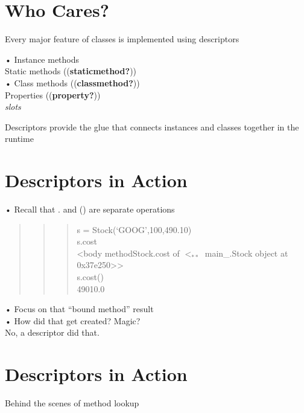 \documentclass[
  letterpaper,
  DIV=11,
  numbers=noendperiod]{scrreprt}
\begin{document}

\chapter{Who Cares?}\label{who-cares}

Every major feature of classes is implemented using descriptors

• Instance methods\\
Static methods ((\textbf{staticmethod?}))\\
• Class methods ((\textbf{classmethod?}))\\
Properties ((\textbf{property?}))\\
\emph{slots}

Descriptors provide the glue that connects instances and classes
together in the runtime


\chapter{Descriptors in Action}\label{descriptors-in-action}

• Recall that . and () are separate operations

\begin{quote}
\begin{quote}
\begin{quote}
s = Stock(`GOOG',100,490.10)\\
s.cost\\
\textless body methodStock.cost of \(<  _{**}\) main\_.Stock object at
0x37e250\textgreater\textgreater{}\\
s.cost()\\
49010.0
\end{quote}
\end{quote}
\end{quote}

• Focus on that ``bound method'' result\\
• How did that get created? Magic?\\
No, a descriptor did that.


\chapter{Descriptors in Action}\label{descriptors-in-action-1}

Behind the scenes of method lookup
\end{document}
